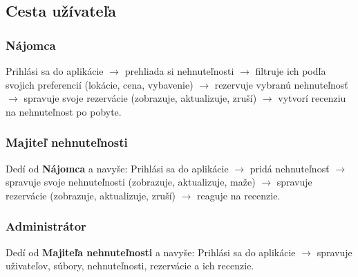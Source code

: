 \subsection{Cesta užívateľa}
\subsubsection*{Nájomca}
Prihlási sa do aplikácie $\rightarrow$ prehliada si nehnuteľnosti $\rightarrow$ filtruje ich podľa svojich preferencií (lokácie, cena, vybavenie) $\rightarrow$ rezervuje vybranú nehnuteľnosť $\rightarrow$ spravuje svoje rezervácie (zobrazuje, aktualizuje, zruší) $\rightarrow$ vytvorí recenziu na nehnuteľnost po pobyte.

\subsubsection*{Majiteľ nehnuteľnosti}
Dedí od \textbf{Nájomca} a navyše: Prihlási sa do aplikácie $\rightarrow$ pridá nehnuteľnosť $\rightarrow$ spravuje svoje nehnuteľnosti (zobrazuje, aktualizuje, maže) $\rightarrow$ spravuje rezervácie (zobrazuje, aktualizuje, zruší) $\rightarrow$ reaguje na recenzie.

\subsubsection*{Administrátor}
Dedí od \textbf{Majiteľa nehnuteľnosti} a navyše: Prihlási sa do aplikácie $\rightarrow$ spravuje uživateľov, súbory, nehnuteľnosti, rezervácie a ich recenzie.
